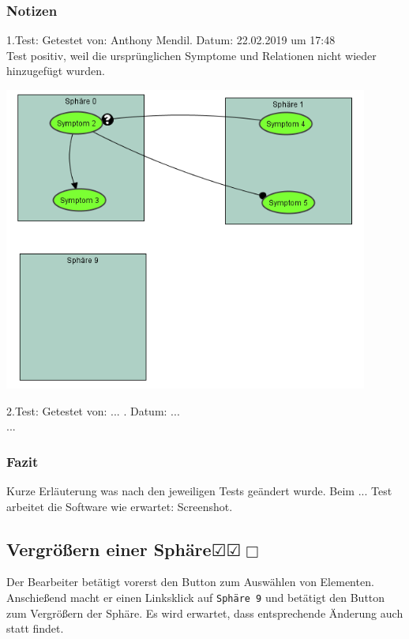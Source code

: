 \documentclass{scrartcl}
\newcommand{\subsectiont}[2]{\subsection[#1]{#1{\normalsize\normalfont #2}}}
\newcommand{\leer}{$\Box$}
\newcommand{\ok}{$\CheckedBox$}
\begin{document}
\subsubsection{Notizen}
1.Test: Getestet von: Anthony Mendil. Datum: 22.02.2019 um 17:48 \\
Test positiv, weil die ursprünglichen Symptome und Relationen nicht wieder hinzugefügt wurden. 
\begin{center}
\includegraphics[height=10cm]{2_11.PNG}
\end{center}
2.Test: Getestet von: ... . Datum: ... \\
... 
\subsubsection{Fazit}
Kurze Erläuterung was nach den jeweiligen Tests geändert wurde. Beim ... Test arbeitet die Software wie erwartet: Screenshot. 

\subsectiont{Vergrößern einer Sphäre}{\dotfill\ok\ok\leer}
Der Bearbeiter betätigt vorerst den Button zum Auswählen von Elementen. Anschießend macht er einen Linksklick auf \texttt{Sphäre 9} und betätigt den Button zum Vergrößern der Sphäre. Es wird erwartet, dass entsprechende Änderung auch statt findet. 
\end{document}
